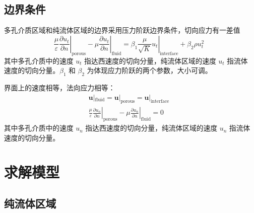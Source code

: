 \subsection{边界条件} %

多孔介质区域和纯流体区域的边界采用压力阶跃边界条件，切向应力有一差值
\begin{equation}
	\left.\frac{\mu}{\varepsilon}\frac{\partial u_t}{\partial n}\right|_{\mathrm{porous}} -
	\left.\mu\frac{\partial u_t}{\partial n}\right|_{\mathrm{fluid}} =
	\left.\beta_1\frac{\mu}{\sqrt K}u_t\right|_{\mathrm{interface}} + \beta_2\rho u_t^2
\end{equation}
其中多孔介质中的速度 $u_t$ 指达西速度的切向分量，纯流体区域的速度 $u_t$ 指流体速度的切向分量。$\beta_1$ 和 $\beta_2$ 为体现应力阶跃的两个参数，大小可调。

界面上的速度相等，法向应力相等：
\begin{gather}
	\bm{u}|_{\mathrm{fluid}} = \bm{u}|_{\mathrm{porous}} = \bm{u}|_{\mathrm{interface}} \\
	\left.\frac{\mu}{\varepsilon}\frac{\partial u_n}{\partial n}\right|_{\mathrm{porous}} -
	\left.\mu\frac{\partial u_n}{\partial n}\right|_{\mathrm{fluid}} = 0
\end{gather}
其中多孔介质中的速度 $u_n$ 指达西速度的切向分量，纯流体区域的速度 $u_n$ 指流体速度的切向分量。




\section{求解模型}\label{sec: model} %

\subsection{纯流体区域}

